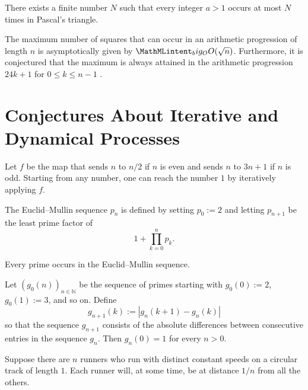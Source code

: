 \begin{conjecture}
  There exists a finite number $N$ such that every integer $a>1$ occurs at most $N$ times in Pascal's triangle.
\end{conjecture}

\begin{conjecture}
  The maximum number of squares that can occur in an arithmetic progression of length $n$ is asymptotically given by $\Oh(\sqrt{n})$. Furthermore, it is conjectured that the maximum is always attained in the arithmetic progression $24k+1$ for $0\leq k\leq n-1$ \cite{rudin1960}.
\end{conjecture}

\section{Conjectures About Iterative and Dynamical Processes}

\begin{conjecture}
  Let $f$ be the map that sends $n$ to $n/2$ if $n$ is even and sends $n$ to $3n+1$ if $n$ is odd. Starting from any number, one can reach the number $1$ by iteratively applying $f$.
\end{conjecture}

The Euclid--Mullin sequence $p_n$ is defined by setting $p_0:=2$ and letting $p_{n+1}$ be the least prime factor of
\begin{equation*}
  1+\prod_{k=0}^np_k.
\end{equation*}

\begin{conjecture}
  Every prime occurs in the Euclid--Mullin sequence.
\end{conjecture}

\begin{conjecture}
  Let $(g_0(n))_{n\in\mathbb{N}}$ be the sequence of primes starting with $g_0(0):=2$, $g_0(1):=3$, and so on. Define
  \begin{equation*}
    g_{n+1}(k):=|g_n(k+1)-g_n(k)|
  \end{equation*}
  so that the sequence $g_{n+1}$ consists of the absolute differences between consecutive entries in the sequence $g_n$. Then $g_n(0)=1$ for every $n>0$.
\end{conjecture}

\begin{conjecture}
  Suppose there are $n$ runners who run with distinct constant speeds on a circular track of length $1$. Each runner will, at some time, be at distance $1/n$ from all the others.
\end{conjecture}

